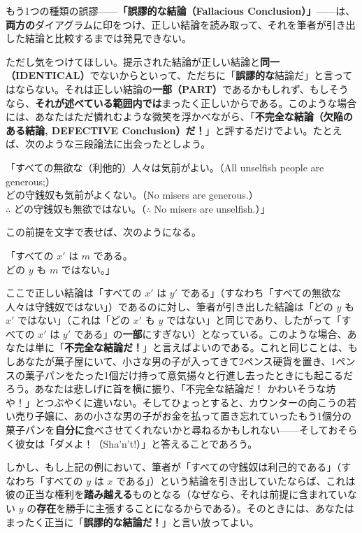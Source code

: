 \documentclass[a4paper,11pt,openany]{ltjsbook}
\begin{document}
もう1つの種類の誤謬——\textbf{「誤謬的な結論（Fallacious Conclusion）」}——は、\textbf{両方の}ダイアグラムに印をつけ、正しい結論を読み取って、それを筆者が引き出した結論と比較するまでは発見できない。

ただし気をつけてほしい。提示された結論が正しい結論と\textbf{同一（IDENTICAL）}でないからといって、ただちに「\textbf{誤謬的な}結論だ」と言ってはならない。それは正しい結論の\textbf{一部（PART）}であるかもしれず、もしそうなら、\textbf{それが述べている範囲内では}まったく正しいからである。このような場合には、あなたはただ憐れむような微笑を浮かべながら、「\textbf{不完全な結論（欠陥のある結論, DEFECTIVE Conclusion）だ！}」と評するだけでよい。たとえば、次のような三段論法に出会ったとしよう。
\begin{center}
「すべての無欲な（利他的）人々は気前がよい。（All unselfish people are generous;）\\
どの守銭奴も気前がよくない。（No misers are generous.）\\
$\therefore$ どの守銭奴も無欲ではない。（$\therefore$ No misers are unselfish.）」
\end{center}
この前提を文字で表せば、次のようになる。
\begin{center}
「すべての $x'$ は $m$ である。\\
どの $y$ も $m$ ではない。」
\end{center}

ここで正しい結論は「すべての $x'$ は $y'$ である」（すなわち「すべての無欲な人々は守銭奴ではない」）であるのに対し、筆者が引き出した結論は「どの $y$ も $x'$ ではない」（これは「どの $x'$ も $y$ ではない」と同じであり、したがって「すべての $x'$ は $y'$ である」の\textbf{一部}にすぎない）となっている。このような場合、あなたは単に「\textbf{不完全な結論だ！}」と言えばよいのである。これと同じことは、もしあなたが菓子屋にいて、小さな男の子が入ってきて2ペンス硬貨を置き、1ペンスの菓子パンをたった1個だけ持って意気揚々と行進し去ったときにも起こるだろう。あなたは悲しげに首を横に振り、「不完全な結論だ！ かわいそうな坊や！」とつぶやくに違いない。そしてひょっとすると、カウンターの向こうの若い売り子嬢に、あの小さな男の子がお金を払って置き忘れていったもう1個分の菓子パンを\textbf{自分に}食べさせてくれないかと尋ねるかもしれない——そしておそらく彼女は「ダメよ！（Sha'n't!）」と答えることであろう。

しかし、もし上記の例において、筆者が「すべての守銭奴は利己的である」（すなわち「すべての $y$ は $x$ である」）という結論を引き出していたならば、これは彼の正当な権利を\textbf{踏み越える}ものとなる（なぜなら、それは前提に含まれていない $y$ の\textbf{存在}を勝手に主張することになるからである）。そのときには、あなたはまったく正当に「\textbf{誤謬的な結論だ！}」と言い放ってよい。
\end{document}
